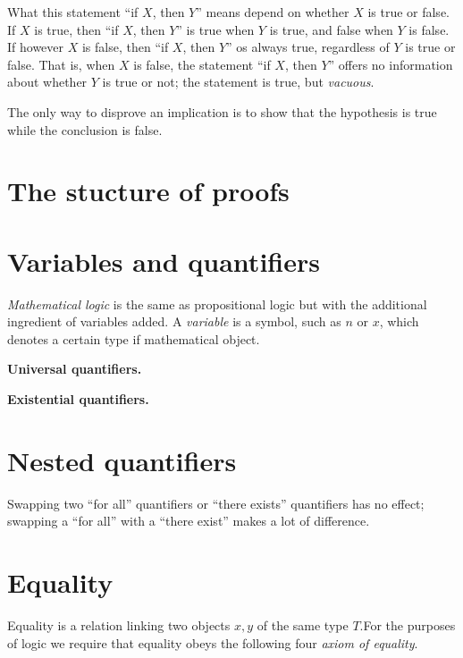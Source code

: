\documentclass[
]{book}
\theoremstyle{definition}
\theoremstyle{definition}
\theoremstyle{definition}
\theoremstyle{definition}
\theoremstyle{remark}
\begin{document}
What this statement ``if \(X\), then \(Y\)'' means depend on whether \(X\) is true or false. If \(X\) is true, then ``if \(X\), then \(Y\)'' is true when \(Y\) is true, and false when \(Y\) is false. If however \(X\) is false, then ``if \(X\), then \(Y\)'' os always true, regardless of \(Y\) is true or false. That is, when \(X\) is false, the statement ``if \(X\), then \(Y\)'' offers no information about whether \(Y\) is true or not; the statement is true, but \emph{vacuous}.

The only way to disprove an implication is to show that the hypothesis is true while the conclusion is false.

\section{The stucture of proofs}\label{the-stucture-of-proofs}

\section{Variables and quantifiers}\label{variables-and-quantifiers}

\emph{Mathematical logic} is the same as propositional logic but with the additional ingredient of variables added. A \emph{variable} is a symbol, such as \(n\) or \(x\), which denotes a certain type if mathematical object.

\textbf{Universal quantifiers.}

\textbf{Existential quantifiers.}

\section{Nested quantifiers}\label{nested-quantifiers}

Swapping two ``for all'' quantifiers or ``there exists'' quantifiers has no effect; swapping a ``for all'' with a ``there exist'' makes a lot of difference.

\section{Equality}\label{equality}

Equality is a relation linking two objects \(x,y\) of the same type \(T\).For the purposes of logic we require that equality obeys the following four \emph{axiom of equality}.
\end{document}
